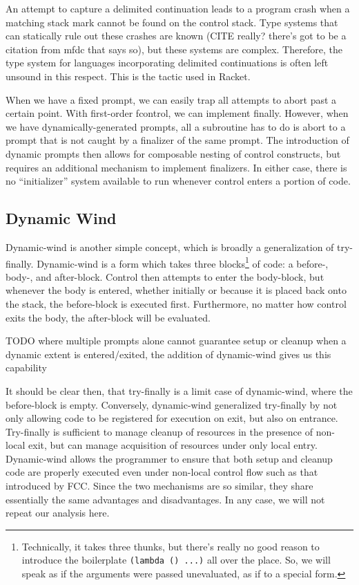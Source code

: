 \documentclass[11pt]{article}
\begin{document}
An attempt to capture a delimited continuation leads to a program crash when a matching stack mark cannot be found on the control stack.
Type systems that can statically rule out these crashes are known (CITE really? there's got to be a citation from mfdc that says so), but these systems are complex.
Therefore, the type system for languages incorporating delimited continuations is often left unsound in this respect.
This is the tactic used in Racket.

When we have a fixed prompt, we can easily trap all attempts to abort past a certain point.
With first-order fcontrol, we can implement finally.
However, when we have dynamically-generated prompts, all a subroutine has to do is abort to a prompt that is not caught by a finalizer of the same prompt.
The introduction of dynamic prompts then allows for composable nesting of control constructs, but requires an additional mechanism to implement finalizers.
In either case, there is no ``initializer'' system available to run whenever control enters a portion of code.



\subsection{Dynamic Wind}
\label{dynamic-wind}

Dynamic-wind is another simple concept, which is broadly a generalization of try-finally.
Dynamic-wind is a form which takes three blocks\footnote{Technically, it takes three thunks, but there's really no good reason to introduce the boilerplate \texttt{(lambda () ...)} all over the place. So, we will speak as if the arguments were passed unevaluated, as if to a special form.} of code: a before-, body-, and after-block.
Control then attempts to enter the body-block, but whenever the body is entered, whether initially or because it is placed back onto the stack, the before-block is executed first.
Furthermore, no matter how control exits the body, the after-block will be evaluated.

TODO where multiple prompts alone cannot guarantee setup or cleanup when a dynamic extent is entered/exited, the addition of dynamic-wind gives us this capability

It should be clear then, that try-finally is a limit case of dynamic-wind, where the before-block is empty.
Conversely, dynamic-wind generalized try-finally by not only allowing code to be registered for execution on exit, but also on entrance.
Try-finally is sufficient to manage cleanup of resources in the presence of non-local exit, but can manage acquisition of resources under only local entry.
Dynamic-wind allows the programmer to ensure that both setup and cleanup code are properly executed even under non-local control flow such as that introduced by FCC.
Since the two mechanisms are so similar, they share essentially the same advantages and disadvantages.
In any case, we will not repeat our analysis here.
\end{document}
